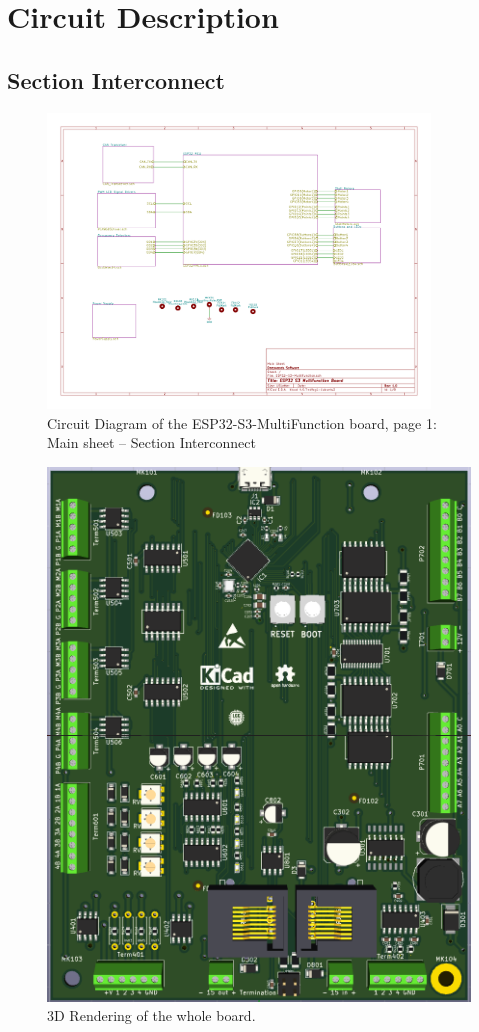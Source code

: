 \section{Circuit Description}

\subsection{Section Interconnect}
\begin{figure}[hbpt]\begin{centering}%
\includegraphics[width=4in]{ESP32-S3-MultiFunction-1.pdf}
\caption{Circuit Diagram of the ESP32-S3-MultiFunction board, page 1: Main 
sheet -- Section Interconnect}
\end{centering}\end{figure}
\begin{figure}[hbpt]\begin{centering}%
\includegraphics{ESP32-S3-MultiFunction-top3D.png}
\caption{3D Rendering of the whole board.}
\end{centering}\end{figure}

